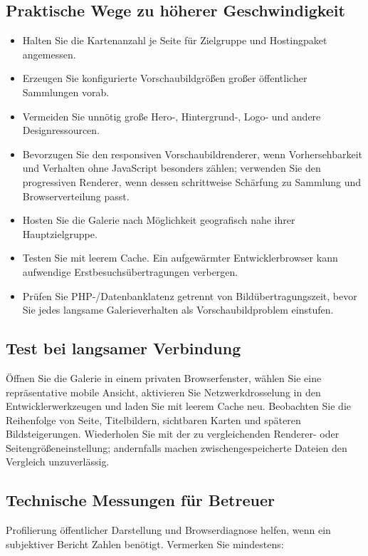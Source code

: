 \documentclass[11pt,a4paper]{article}
\begin{document}
\subsection{Praktische Wege zu höherer Geschwindigkeit}

\begin{itemize}
  \item Halten Sie die Kartenanzahl je Seite für Zielgruppe und Hostingpaket
  angemessen.
  \item Erzeugen Sie konfigurierte Vorschaubildgrößen großer öffentlicher
  Sammlungen vorab.
  \item Vermeiden Sie unnötig große Hero-, Hintergrund-, Logo- und andere
  Designressourcen.
  \item Bevorzugen Sie den responsiven Vorschaubildrenderer, wenn
  Vorhersehbarkeit und Verhalten ohne JavaScript besonders zählen; verwenden Sie
  den progressiven Renderer, wenn dessen schrittweise Schärfung zu Sammlung und
  Browserverteilung passt.
  \item Hosten Sie die Galerie nach Möglichkeit geografisch nahe ihrer
  Hauptzielgruppe.
  \item Testen Sie mit leerem Cache. Ein aufgewärmter Entwicklerbrowser kann
  aufwendige Erstbesuchsübertragungen verbergen.
  \item Prüfen Sie PHP-/Datenbanklatenz getrennt von Bildübertragungszeit, bevor
  Sie jedes langsame Galerieverhalten als Vorschaubildproblem einstufen.
\end{itemize}

\subsection{Test bei langsamer Verbindung}

Öffnen Sie die Galerie in einem privaten Browserfenster, wählen Sie eine
repräsentative mobile Ansicht, aktivieren Sie Netzwerkdrosselung in den
Entwicklerwerkzeugen und laden Sie mit leerem Cache neu. Beobachten Sie die
Reihenfolge von Seite, Titelbildern, sichtbaren Karten und späteren
Bildsteigerungen. Wiederholen Sie mit der zu vergleichenden Renderer- oder
Seitengrößeneinstellung; andernfalls machen zwischengespeicherte Dateien den
Vergleich unzuverlässig.

\subsection{Technische Messungen für Betreuer}

Profilierung öffentlicher Darstellung und Browserdiagnose helfen, wenn ein
subjektiver Bericht Zahlen benötigt. Vermerken Sie mindestens:
\end{document}
